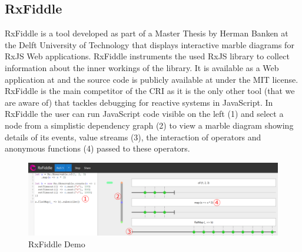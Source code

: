 	\subsection{RxFiddle}
	\label{sec:RxFiddle}
	RxFiddle \cite{RxFiddle} is a tool developed as part of a Master Thesis by Herman Banken at the Delft University of Technology that displays interactive marble diagrams for RxJS Web applications. RxFiddle instruments the used RxJS library to collect information about the inner workings of the library. It is available as a Web application at \cite{RxFiddle} and the source code is publicly available at \cite{RxFiddleGitHub} under the MIT license. RxFiddle is the main competitor of the CRI as it is the only other tool (that we are aware of) that tackles debugging for reactive systems in JavaScript. In RxFiddle the user can run JavaScript code visible on the left (1) and select a node from a simplistic dependency graph (2) to view a marble diagram showing details of its events, value streams (3), the interaction of operators and anonymous functions (4) passed to these operators.
	
	\begin{figure}[!h]
		\centering
		\includegraphics[scale=0.5,trim=0 0 0 0]{gfx/RxFiddleDemo.png}
		\caption{RxFiddle Demo \protect\cite{RxFiddle}}
		\label{fig:RxFiddleDemo}
	\end{figure}

